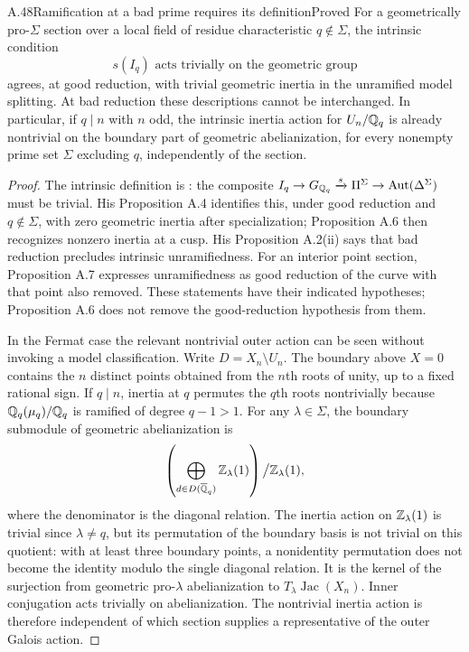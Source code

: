 \begin{statement}{A.48}{Ramification at a bad prime requires its definition}{Proved}
For a geometrically pro-$\Sigma$ section over a local field of residue
characteristic $q\notin\Sigma$, the intrinsic condition
\[
 s(I_q)\text{ acts trivially on the geometric group}
\]
agrees, at good reduction, with trivial geometric inertia in the
unramified model splitting. At bad reduction these descriptions cannot
be interchanged. In particular, if $q\mid n$ with $n$ odd, the intrinsic
inertia action for $U_n/\mathbb Q_q$ is already nontrivial on the boundary
part of geometric abelianization, for every nonempty prime set
$\Sigma$ excluding $q$, independently of the section.
\end{statement}
\begin{proof}
The intrinsic definition is
\citet[Appendix A, Definition A.1]{AMHoshi2012}: the composite
$I_q\to G_{\mathbb Q_q}\xrightarrow{s}\Pi^\Sigma\to
\operatorname{Aut}(\Delta^\Sigma)$ must be trivial.
His Proposition A.4 identifies this, under good reduction and
$q\notin\Sigma$, with zero geometric inertia after specialization;
Proposition A.6 then recognizes nonzero inertia at a cusp. His
Proposition A.2(ii) says that bad reduction precludes intrinsic
unramifiedness. For an interior point section, Proposition A.7
expresses unramifiedness as good reduction of the curve with that
point also removed. These statements have their indicated hypotheses;
Proposition A.6 does not remove the good-reduction hypothesis from them.

In the Fermat case the relevant nontrivial outer action can be seen
without invoking a model classification. Write $D=X_n\setminus U_n$.
The boundary above $X=0$ contains the $n$ distinct points obtained from
the $n$th roots of unity, up to a fixed rational sign. If $q\mid n$,
inertia at $q$ permutes the $q$th roots nontrivially because
$\mathbb Q_q(\mu_q)/\mathbb Q_q$ is ramified of degree $q-1>1$.
For any $\lambda\in\Sigma$, the boundary submodule of geometric
abelianization is
\[
 \left(\bigoplus_{d\in D(\overline{\mathbb Q}_q)}\mathbb Z_\lambda(1)\right)
       \big/\mathbb Z_\lambda(1),
\]
where the denominator is the diagonal relation. The inertia action on
$\mathbb Z_\lambda(1)$ is trivial since $\lambda\ne q$, but its permutation
of the boundary basis is not trivial on this quotient: with at least
three boundary points, a nonidentity permutation does not become the
identity modulo the single diagonal relation. It is the kernel of the surjection from geometric pro-$\lambda$
abelianization to $T_\lambda\operatorname{Jac}(X_n)$. Inner conjugation acts
trivially on abelianization. The nontrivial inertia action is therefore
independent of which section supplies a representative of the outer
Galois action.


\end{proof}
